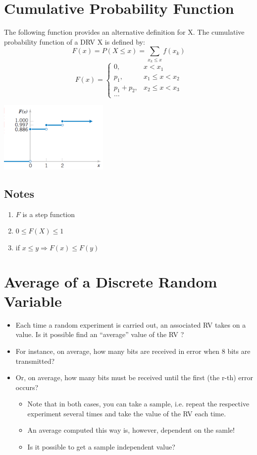 \documentclass[12pt]{article}
\theoremstyle{definition}
\begin{document}
\section{Cumulative Probability Function}
The following function provides an alternative definition for X.
The cumulative probability function of a DRV X is defined by:
\[
    \displaystyle F(x) = P(X \leq x) = \sum_{x_k \leq x}f(x_k)
\]
\[ F(x)= \begin{cases} 
    0, & x < x_1 \\
    p_1, & x_1 \leq x < x_2 \\
    p_1 + p_2, & x_2 \leq x < x_3 \\
    \dots
\end{cases}
\]
\begin{center}
    \includegraphics[width=200px]{3.png}
\end{center}
\subsection{Notes}
\begin{enumerate}
    \item $F$ is a step function
    \item $  0 \leq F(X) \leq 1   $
    \item if $x \leq y \Rightarrow F(x) \leq F(y)$
\end{enumerate}
\section{Average of a Discrete Random Variable}
\begin{itemize}
    \item Each time a random experiment is carried out, an associated RV takes on a
        value. Is it possible find an “average” value of the RV ?
    \item For instance, on average, how many bits are received in error
        when 8 bits are transmitted?
    \item Or, on average, how many bits must be received until the first (the
        r-th) error occurs?
        \begin{itemize}
            \item Note that in both cases, you can take a sample, i.e. repeat the
                respective experiment several times and take the value of the
                RV each time.
            \item An average computed this way is, however, dependent on the samle!
            \item Is it possible to get a sample independent value?
        \end{itemize}
\end{itemize}
\end{document}
